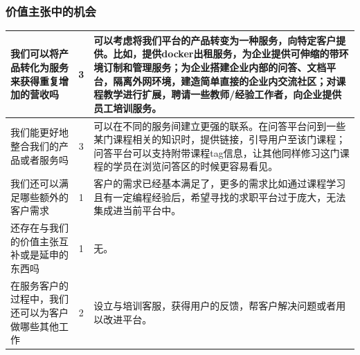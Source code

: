 \documentclass[a4paper]{ctexart}
\begin{document}
\subsubsection{价值主张中的机会}
\begin{table}[h]
  \centering
\begin{tabular}{|p{3.5cm}|c|p{10cm}|}
  \hline
  我们可以将产品转化为服务来获得重复增加的营收吗 & 3 & 可以考虑将我们平台的产品转变为一种服务，向特定客户提供。比如，提供docker出租服务，为企业提供可伸缩的带环境订制和管理服务；为企业搭建企业内部的问答、文档平台，隔离外网环境，建造简单直接的企业内交流社区；对课程教学进行扩展，聘请一些教师/经验工作者，向企业提供员工培训服务。\\
  \hline
  我们能更好地整合我们的产品或者服务吗 & 3 & 可以在不同的服务间建立更强的联系。在问答平台问到一些某门课程相关的知识时，提供链接，引导用户至该门课程；问答平台可以支持附带课程tag信息，让其他同样修习这门课程的学员在浏览问答区的时候更容易看见。\\
  \hline
  我们还可以满足哪些额外的客户需求 & 1 & 客户的需求已经基本满足了，更多的需求比如通过课程学习且有一定编程经验后，希望寻找的求职平台过于庞大，无法集成进当前平台中。\\
  \hline
  还存在与我们的价值主张互补或是延申的东西吗 & 1 & 无。\\
  \hline
  在服务客户的过程中，我们还可以为客户做哪些其他工作 & 2 & 设立与培训客服，获得用户的反馈，帮客户解决问题或者用以改进平台。\\
  \hline
\end{tabular}
\end{table}




\end{document}
